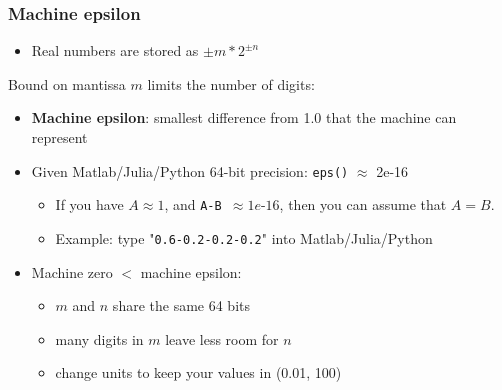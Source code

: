 \documentclass[bigger]{beamer}
\let\TEXTsymbol\ensuremath
\begin{document}
\begin{frame}%

\frametitle{Machine epsilon}

\begin{itemize}
\item Real numbers are stored as $\pm m\ast 2^{\pm n}$
\end{itemize}

Bound on mantissa $m$ limits the number of digits:

\begin{itemize}
\item \textbf{Machine epsilon}: smallest difference from 1.0\newline
that the machine can represent

\item Given Matlab/Julia/Python 64-bit precision: \texttt{eps()} $\approx $ 2e-16

\begin{itemize}
\item If you have $A\approx 1$, and \texttt{A-B }$\approx 1e$-$16$, \newline
then you can assume that $A=B$.

\item Example: type "\texttt{0.6-0.2-0.2-0.2}" into Matlab/Julia/Python
\end{itemize}

\item Machine zero \TEXTsymbol{<} machine epsilon:

\begin{itemize}
\item $m$ and $n$ share the same 64 bits

\item many digits in $m$ leave less room for $n$

\item change units to keep your values in (0.01, 100)
\end{itemize}
\end{itemize}

\end{frame}%
\end{document}
